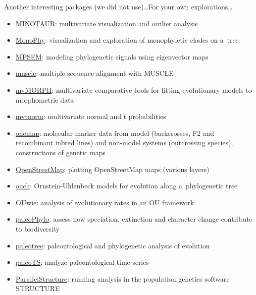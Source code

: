\documentclass[compress, xelatex, 11pt, xcolor=svgnames, aspectratio=169, url={hyphens, lowtilde}]{beamer}
\begin{document}
\begin{frame}[allowframebreaks]{Another interesting packages (we did not use)\ldots}{For your own explorations\ldots}
\begin{itemize}
		\item \href{https://github.com/NESCent/MINOTAUR}{MINOTAUR}: multivariate visualization and outlier analysis
		\item \href{https://CRAN.R-project.org/package=MonoPhy}{MonoPhy}: visualization and exploration of monophyletic clades on a~tree
		\item \href{https://CRAN.R-project.org/package=MPSEM}{MPSEM}: modeling phylogenetic signals using eigenvector maps
		\item \href{https://bioconductor.org/packages/release/bioc/html/muscle.html}{muscle}: multiple sequence alignment with MUSCLE
		\item \href{https://CRAN.R-project.org/package=mvMORPH}{mvMORPH}: multivariate comparative tools for fitting evolutionary models to morphometric data
		\item \href{https://CRAN.R-project.org/package=mvtnorm}{mvtnorm}: multivariate normal and t probabilities
		\item \href{https://CRAN.R-project.org/package=onemap}{onemap}: molecular marker data from model (backcrosses, F2 and recombinant inbred lines) and non-model systems (outcrossing species), constructions of genetic maps
		\item \href{https://CRAN.R-project.org/package=OpenStreetMap}{OpenStreetMap}: plotting OpenStreetMap maps (various layers)
		\item \href{https://CRAN.R-project.org/package=ouch}{ouch}: Ornstein-Uhlenbeck models for evolution along a~phylogenetic tree
		\item \href{https://CRAN.R-project.org/package=OUwie}{OUwie}: analysis of evolutionary rates in an OU framework
		\item \href{https://r-forge.r-project.org/projects/paleophylo/}{paleoPhylo}: assess how speciation, extinction and character change contribute to biodiversity
		\item \href{https://CRAN.R-project.org/package=paleotree}{paleotree}: paleontological and phylogenetic analysis of evolution
		\item \href{https://CRAN.R-project.org/package=paleoTS}{paleoTS}: analyze paleontological time-series
		\item \href{https://r-forge.r-project.org/projects/parallstructure/}{ParallelStructure}: running analysis in the population genetics software STRUCTURE

\end{itemize}
\end{frame}
\end{document}
